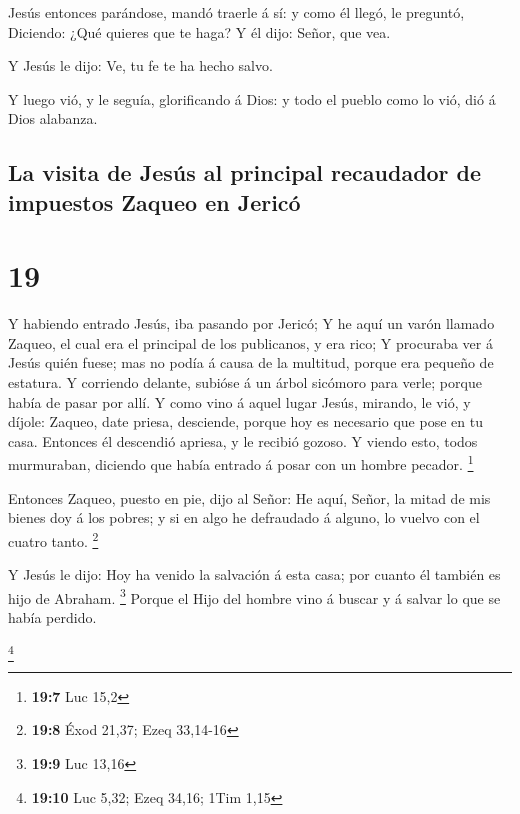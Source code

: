  Jesús entonces parándose, mandó traerle á sí: y como él
llegó, le preguntó,  Diciendo: ¿Qué quieres que te haga?
Y él dijo: Señor, que vea.

 Y Jesús le dijo: Ve, tu fe te ha hecho salvo.

 Y luego vió, y le seguía, glorificando á Dios: y todo el
pueblo como lo vió, dió á Dios alabanza.

\hypertarget{la-visita-de-jesuxfas-al-principal-recaudador-de-impuestos-zaqueo-en-jericuxf3}{%
\subsection{La visita de Jesús al principal recaudador de impuestos
Zaqueo en
Jericó}\label{la-visita-de-jesuxfas-al-principal-recaudador-de-impuestos-zaqueo-en-jericuxf3}}

\hypertarget{section-18}{%
\section{19}\label{section-18}}

 Y habiendo entrado Jesús, iba pasando por Jericó;
 Y he aquí un varón llamado Zaqueo, el cual era el
principal de los publicanos, y era rico;  Y procuraba ver
á Jesús quién fuese; mas no podía á causa de la multitud, porque era
pequeño de estatura.  Y corriendo delante, subióse á un
árbol sicómoro para verle; porque había de pasar por allí.
 Y como vino á aquel lugar Jesús, mirando, le vió, y
díjole: Zaqueo, date priesa, desciende, porque hoy es necesario que pose
en tu casa.  Entonces él descendió apriesa, y le recibió
gozoso.  Y viendo esto, todos murmuraban, diciendo que
había entrado á posar con un hombre pecador. \footnote{\textbf{19:7} Luc
  15,2}

 Entonces Zaqueo, puesto en pie, dijo al Señor: He aquí,
Señor, la mitad de mis bienes doy á los pobres; y si en algo he
defraudado á alguno, lo vuelvo con el cuatro tanto. \footnote{\textbf{19:8}
  Éxod 21,37; Ezeq 33,14-16}

 Y Jesús le dijo: Hoy ha venido la salvación á esta casa;
por cuanto él también es hijo de Abraham. \footnote{\textbf{19:9} Luc
  13,16}  Porque el Hijo del hombre vino á buscar y á
salvar lo que se había perdido.

\footnote{\textbf{19:10} Luc 5,32; Ezeq 34,16; 1Tim 1,15}

